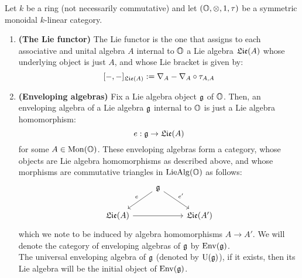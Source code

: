             \begin{definition} \label{def: enveloping_algebras}
                Let $k$ be a ring (not necessarily commutative) and let $(\O, \tensor, 1, \tau)$ be a symmetric monoidal $k$-linear category.
                    \begin{enumerate}
                        \item \textbf{(The Lie functor)} The Lie functor is the one that assigns to each associative and unital algebra $A$ internal to $\mathbb{O}$ a Lie algebra $\mathfrak{Lie}(A)$ whose underlying object is just $A$, and whose Lie bracket is given by:
                            $$[-,-]_{\mathfrak{Lie}(A)} := \nabla_A - \nabla_A \circ \tau_{A,A}$$
                        \item \textbf{(Enveloping algebras)} Fix a Lie algebra object $\mathfrak{g}$ of $\mathbb{O}$. Then, an enveloping algebra of a Lie algebra $\mathfrak{g}$ internal to $\mathbb{O}$ is just a Lie algebra homomorphism:
                            $$e: \mathfrak{g} \to \mathfrak{Lie}(A)$$
                        for some $A \in \mathrm{Mon}(\mathbb{O})$. These enveloping algebras form a category, whose objects are Lie algebra homomorphisms as described above, and whose morphisms are commutative triangles in $\mathrm{Lie}\mathrm{Alg}(\mathbb{O})$ as follows:
                            $$
                                \begin{tikzcd}
                                	& {\g} \\
                                	{\frakLie(A)} && {\frakLie(A')}
                                	\arrow[from=2-1, to=2-3]
                                	\arrow["{e}"', from=1-2, to=2-1]
                                	\arrow["{e'}", from=1-2, to=2-3]
                                \end{tikzcd}
                            $$
                        which we note to be induced by algebra homomorphisms $A \to A'$. We will denote the category of enveloping algebras of $\mathfrak{g}$ by $\mathrm{Env}(\mathfrak{g})$. 
                        \\
                        The universal enveloping algebra of $\mathfrak{g}$ (denoted by $\mathrm{U}(\mathfrak{g})$), if it exists, then its Lie algebra will be the initial object of $\mathrm{Env}(\mathfrak{g})$. 
                    \end{enumerate}
            \end{definition}
            
